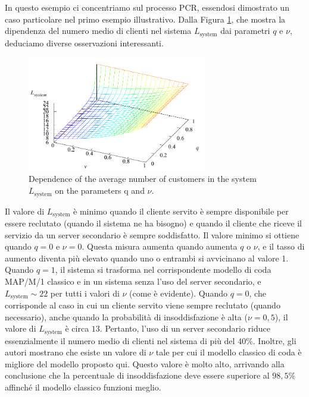 \documentclass[11pt]{article}
\begin{document}
\noindent In questo esempio ci concentriamo sul processo PCR, essendosi dimostrato un caso particolare nel primo esempio illustrativo. Dalla Figura \ref{fig:6}, che mostra la dipendenza del numero medio di clienti nel sistema $L_\mathrm{system}$ dai parametri $q$ e $\nu$, deduciamo diverse osservazioni interessanti.

\begin{figure}[h]
    \centering
    \includegraphics[width=0.7\textwidth]{qUQVrEZ.png}
    \caption{Dependence of the average number of customers in the system $L_\mathrm{system}$ on the parameters q and $\nu$.}
    \label{fig:6}
\end{figure}

Il valore di $L_\mathrm{system}$ è minimo quando il cliente servito è sempre disponibile per essere reclutato (quando il sistema ne ha bisogno) e quando il cliente che riceve il servizio da un server secondario è sempre soddisfatto. Il valore minimo si ottiene quando $q = 0$ e $\nu = 0$. Questa misura aumenta quando aumenta $q$ o $\nu$, e il tasso di aumento diventa più elevato quando uno o entrambi si avvicinano al valore 1. Quando $q = 1$, il sistema si trasforma nel corrispondente modello di coda MAP/M/1 classico e in un sistema senza l'uso del server secondario, e $L_\mathrm{system} \sim 22$ per tutti i valori di $\nu$ (come è evidente). Quando $q = 0$, che corrisponde al caso in cui un cliente servito viene sempre reclutato (quando necessario), anche quando la probabilità di insoddisfazione è alta ($\nu = 0,5$), il valore di $L_\mathrm{system}$ è circa $13$. Pertanto, l'uso di un server secondario riduce essenzialmente il numero medio di clienti nel sistema di più del $40\%$. Inoltre, gli autori mostrano che esiste un valore di $\nu$ tale per cui il modello classico di coda è migliore del modello proposto qui. Questo valore è molto alto, arrivando alla conclusione che la percentuale di insoddisfazione deve essere superiore al $98,5\%$ affinché il modello classico funzioni meglio. \vspace{0.4cm}
\end{document}
